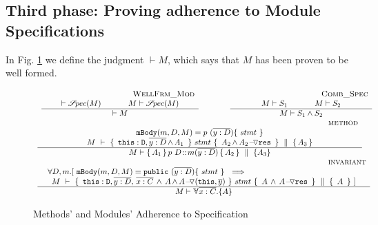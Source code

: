 \subsection{Third phase: Proving adherence to Module Specifications}
\label{sect:wf}

In Fig. \ref{f:wf} we  define the judgment $\vdash M$, which says that  
$M$ has been proven to be well formed. 
 

\begin{figure}[thb]
$
\begin{array}{l}
\begin{array}{lcl}
\inferruleSDNarrow 
{~ \strut  {\sc{WellFrm\_Mod}}}
{  \vdash \SpecOf {M}
  \hspace{1.2cm}  M \vdash \SpecOf {M}
}
{
\vdash M  
}
& \hspace{0.7cm} &
\inferruleSDNarrow 
{~ \strut   {\sc{Comb\_Spec}}}
{  
M \vdash S_1 \hspace{1.2cm}  M \vdash S_2
}
{
M \vdash S_1 \wedge S_2
}
\end{array}
\\
\inferruleSD 
{~ \strut \hspace{6.5cm} {\sc{method}}}
{  
 \prg{mBody}(m,D,M)=p \ (\overline{y:D})\{\  stmt \ \}       
    \\
  {\hprovesN{M} { \ \prg{this}:\prg{D}, \overline{y:D}\, {\wedge\, A_1}\  } %
  {\ stmt\ } {\ A_2\, \sdN{\wedge\, \PushASLong {\prg{res}} {A_2}} \ }   {A_3} } 
}
{
M \vdash {\mprepostN {A_1}{p\ D}{m}{y}{D}{A_2} {A_3} }
}
\\
\inferruleSD 
{~ \strut \hspace{6.5cm} {\sc{invariant}}}
{
\begin{array}{l}
\forall  D,  m.[\  \prg{mBody}(m,D,M)=\prg{public} \ (\overline{y:D})\{\  stmt \ \}      \ \ \Longrightarrow  
  \\
 \begin{array}{l}
   \hprovesN {M}  
{ \ \prg{this}:\prg{D}, \overline{y:D},\,   \overline{x:C} \, \wedge\,  A \, \sdN{\wedge\, \PushASLong {(\prg{this},\overline y)} {A}}\, }  
  	{\ stmt\ }   
	 {\  A\, \wedge\, \PushASLong {\prg{res}} {A} \ }  
{\ A \ } \ ]
 \end{array}
 \end{array}
}
{
M \vdash \TwoStatesN{ \overline{x:C}} {A}
}
\end{array}
$
\caption{Methods' and Modules' Adherence to Specification}
\label{f:wf}
\end{figure}

